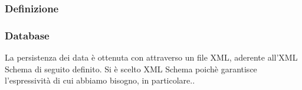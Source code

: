 \subsubsection{Definizione}
	
\subsubsection{Database}
	La persistenza dei data \`e ottenuta con attraverso un file XML, aderente all'XML Schema di seguito definito.
Si \`e scelto XML Schema poich\`e garantisce l'espressivit\`a di cui abbiamo bisogno, in particolare..